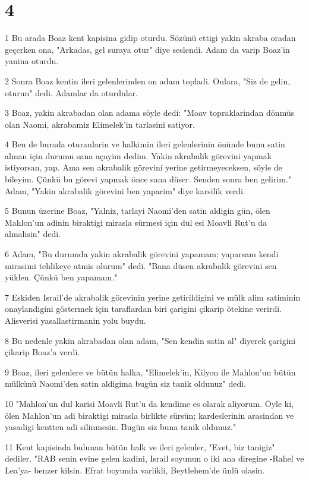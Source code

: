 \chapter{4}

\par 1 Bu arada Boaz kent kapisina gidip oturdu. Sözünü ettigi yakin akraba oradan geçerken ona, "Arkadas, gel suraya otur" diye seslendi. Adam da varip Boaz'in yanina oturdu.
\par 2 Sonra Boaz kentin ileri gelenlerinden on adam topladi. Onlara, "Siz de gelin, oturun" dedi. Adamlar da oturdular.
\par 3 Boaz, yakin akrabadan olan adama söyle dedi: "Moav topraklarindan dönmüs olan Naomi, akrabamiz Elimelek'in tarlasini satiyor.
\par 4 Ben de burada oturanlarin ve halkimin ileri gelenlerinin önünde bunu satin alman için durumu sana açayim dedim. Yakin akrabalik görevini yapmak istiyorsan, yap. Ama sen akrabalik görevini yerine getirmeyeceksen, söyle de bileyim. Çünkü bu görevi yapmak önce sana düser. Senden sonra ben gelirim." Adam, "Yakin akrabalik görevini ben yaparim" diye karsilik verdi.
\par 5 Bunun üzerine Boaz, "Yalniz, tarlayi Naomi'den satin aldigin gün, ölen Mahlon'un adinin biraktigi mirasla sürmesi için dul esi Moavli Rut'u da almalisin" dedi.
\par 6 Adam, "Bu durumda yakin akrabalik görevini yapamam; yaparsam kendi mirasimi tehlikeye atmis olurum" dedi. "Bana düsen akrabalik görevini sen yüklen. Çünkü ben yapamam."
\par 7 Eskiden Israil'de akrabalik görevinin yerine getirildigini ve mülk alim satiminin onaylandigini göstermek için taraflardan biri çarigini çikarip ötekine verirdi. Alisverisi yasallastirmanin yolu buydu.
\par 8 Bu nedenle yakin akrabadan olan adam, "Sen kendin satin al" diyerek çarigini çikarip Boaz'a verdi.
\par 9 Boaz, ileri gelenlere ve bütün halka, "Elimelek'in, Kilyon ile Mahlon'un bütün mülkünü Naomi'den satin aldigima bugün siz tanik oldunuz" dedi.
\par 10 "Mahlon'un dul karisi Moavli Rut'u da kendime es olarak aliyorum. Öyle ki, ölen Mahlon'un adi biraktigi mirasla birlikte sürsün; kardeslerinin arasindan ve yasadigi kentten adi silinmesin. Bugün siz buna tanik oldunuz."
\par 11 Kent kapisinda bulunan bütün halk ve ileri gelenler, "Evet, biz tanigiz" dediler. "RAB senin evine gelen kadini, Israil soyunun o iki ana diregine -Rahel ve Lea'ya- benzer kilsin. Efrat boyunda varlikli, Beytlehem'de ünlü olasin.

